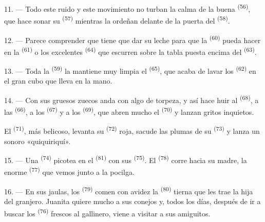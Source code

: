 11. --- Todo este ruido y este movimiento no turban la calma de la buena
 \textsuperscript{(56)}, que hace sonar su 
\textsuperscript{(57)} mientras la ordeñan delante de la puerta del
 \textsuperscript{(58)}.

12. --- Parece comprender que tiene que dar su leche para que la
 \textsuperscript{(60)} pueda hacer  en la
 \textsuperscript{(61)} o los excelentes 
\textsuperscript{(64)} que escurren sobre la tabla puesta encima del
 \textsuperscript{(63)}.

13. --- Toda la  \textsuperscript{(59)} la mantiene muy limpia el
 \textsuperscript{(65)}, que acaba de lavar los
 \textsuperscript{(62)} en el gran cubo que lleva en la
mano.

\VUsaut{3.0mm}
\VUsaut{3.0mm}

14. --- Con sus gruesos zuecos anda con algo de torpeza, y así hace huir
al  \textsuperscript{(68)}, a las  \textsuperscript{(66)}, a los
 \textsuperscript{(67)} y a los  \textsuperscript{(69)}, que abren
mucho el  \textsuperscript{(70)} y lanzan gritos inquietos.

El  \textsuperscript{(71)}, más belicoso, levanta su 
\textsuperscript{(72)} roja, sacude las plumas de su  \textsuperscript{(73)} y
lanza un sonoro «quiquiriquí».

15. --- Una  \textsuperscript{(74)} picotea en el
 \textsuperscript{(81)} con sus  \textsuperscript{(75)}.
El  \textsuperscript{(78)} corre hacia su madre, la enorme
 \textsuperscript{(77)} que vemos junto a la pocilga.

16. --- En sus jaulas, los  \textsuperscript{(79)} comen con avidez la
 \textsuperscript{(80)} tierna que les trae la hija del granjero.
Juanita quiere mucho a sus conejos y, todos los días, después de ir a
buscar los  \textsuperscript{(76)} frescos al gallinero, viene a
visitar a sus amiguitos.
\VUsaut{6.0mm}
\VUfilet{22mm}
